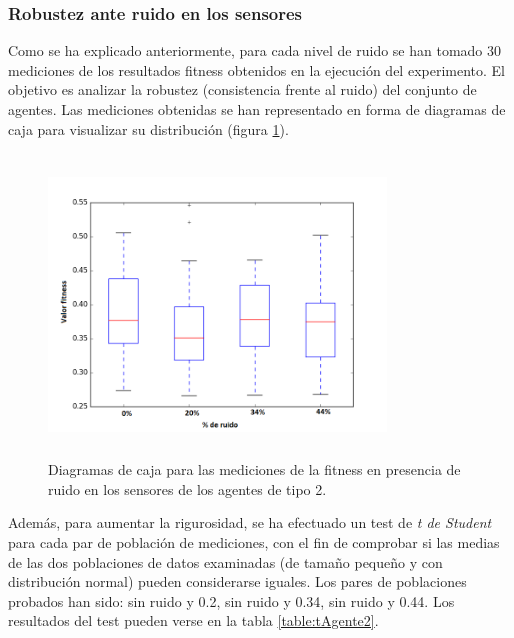 \subsubsection{Robustez ante ruido en los sensores}
Como se ha explicado anteriormente, para cada nivel de ruido se han tomado 30 mediciones de los resultados fitness obtenidos en la ejecución del experimento. El objetivo es analizar la robustez (consistencia frente al ruido) del conjunto de agentes. Las mediciones obtenidas se han representado en forma de diagramas de caja para visualizar su distribución (figura \ref{fig:boxPlot2}).

\begin{figure}[H]
    \centering
    \includegraphics[width=0.8\textwidth,height=8cm]{Imagenes/BoxPlot2}
    \caption{Diagramas de caja para las mediciones de la fitness en presencia de ruido en los sensores de los agentes de tipo 2.}
    \label{fig:boxPlot2}
\end{figure}

Además, para aumentar la rigurosidad, se ha efectuado un test de \textit{t de Student} para cada par de población de mediciones, con el fin de comprobar si las medias de las dos poblaciones de datos examinadas (de tamaño pequeño y con distribución normal) pueden considerarse iguales. Los pares de poblaciones probados han sido: sin ruido y 0.2, sin ruido y 0.34, sin ruido y 0.44. Los resultados del test pueden verse en la tabla \ref{table:tAgente2}.

